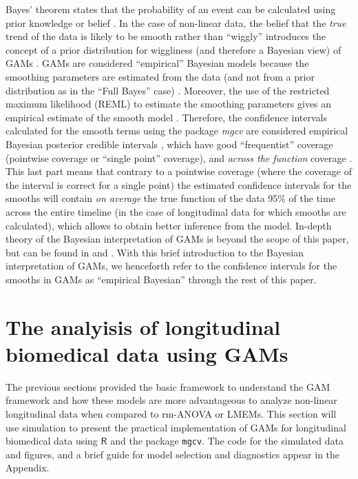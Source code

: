 \documentclass[Royal,times,doublespace,sagev]{sagej}
\newcommand{\passthrough}[1]{#1}
\begin{document}
Bayes' theorem states that the probability of an event can be calculated using prior knowledge or belief \cite{mcelreath2018}. In the case of non-linear data, the belief that the \emph{true} trend of the data is likely to be smooth rather than ``wiggly'' introduces the concept of a prior distribution for wiggliness (and therefore a Bayesian view) of GAMs \cite{wood2017}. GAMs are considered ``empirical'' Bayesian models because the smoothing parameters are estimated from the data (and not from a prior distribution as in the ``Full Bayes'' case) \cite{miller2019}. Moreover, the use of the restricted maximum likelihood (REML) to estimate the smoothing parameters gives an empirical estimate of the smooth model \cite{laird1982, pedersen2019}. Therefore, the confidence intervals calculated for the smooth terms using the package \emph{mgcv} are considered empirical Bayesian posterior credible intervals \cite{pedersen2019}, which have good ``frequentist'' coverage (pointwise coverage or ``single point'' coverage), and \emph{across the function} coverage \cite{wood2017}. This last part means that contrary to a pointwise coverage (where the coverage of the interval is correct for a single point) the estimated confidence intervals for the smooths will contain \emph{on average} the true function of the data 95\% of the time across the entire timeline (in the case of longitudinal data for which smooths are calculated), which allows to obtain better inference from the model. In-depth theory of the Bayesian interpretation of GAMs is beyond the scope of this paper, but can be found in \cite{miller2019, wood2017, simpson2018} and \cite{marra2012}. With this brief introduction to the Bayesian interpretation of GAMs, we henceforth refer to the confidence intervals for the smooths in GAMs as ``empirical Bayesian'' through the rest of this paper.

\hypertarget{longitudinal-GAMs}{%
\section{The analyisis of longitudinal biomedical data using GAMs}\label{longitudinal-GAMs}}

The previous sections provided the basic framework to understand the GAM framework and how these models are more advantageous to analyze non-linear longitudinal data when compared to rm-ANOVA or LMEMs. This section will use simulation to present the practical implementation of GAMs for longitudinal biomedical data using \(\textsf{R}\) and the package \passthrough{\lstinline!mgcv!}. The code for the simulated data and figures, and a brief guide for model selection and diagnostics appear in the Appendix.
\end{document}
